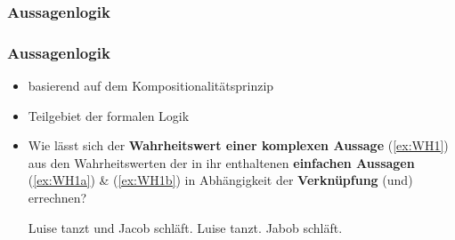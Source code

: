 %
\subsubsection{Aussagenlogik}
\begin{frame}
\frametitle{Aussagenlogik}

\begin{itemize}
	\item basierend auf dem Kompositionalitätsprinzip
	\medskip
	\item Teilgebiet der formalen Logik
	\medskip
	\item Wie lässt sich der \textbf{Wahrheitswert einer komplexen Aussage} (\ref{ex:WH1}) aus den Wahrheitswerten der in ihr enthaltenen \textbf{einfachen Aussagen} (\ref{ex:WH1a}) \& (\ref{ex:WH1b}) in Abhängigkeit der \textbf{Verknüpfung} (und) errechnen?
	
\ea \label{ex:WH1} Luise tanzt und Jacob schläft.
	\ea \label{ex:WH1a} Luise tanzt.
	\ex \label{ex:WH1b} Jabob schläft.
	\z
\z

\end{itemize}

\end{frame}


